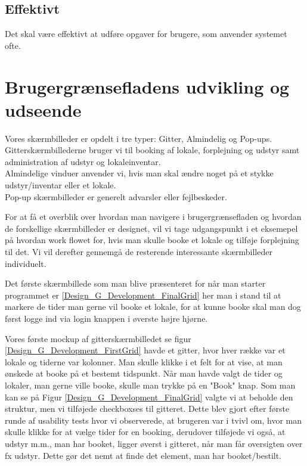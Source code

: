 \subsection{Effektivt}
Det skal være effektivt at udføre opgaver for brugere, som anvender systemet ofte.

\section{Brugergrænsefladens udvikling og udseende}
\label{Design_G_Development}
Vores skærmbilleder er opdelt i tre typer: Gitter, Almindelig og Pop-ups. 
\\Gitterskærmbillederne bruger vi til booking af lokale, forplejning og udstyr samt administration af udstyr og lokaleinventar.
\\Almindelige vinduer anvender vi, hvis man skal ændre noget på et stykke udstyr/inventar eller et lokale.
\\Pop-up skærmbilleder er generelt advarsler eller fejlbeskeder.

For at få et overblik over hvordan man navigere i brugergrænsefladen og hvordan de forskellige skærmbilleder er designet, vil vi tage udgangspunkt i et eksemepel på hvordan work flowet for, hvis man skulle booke et lokale og tilføje forplejning til det. Vi vil derefter gennemgå de resterende interessante skærmbilleder individuelt.

Det første skærmbillede som man blive præsenteret for når man starter programmet er \ref{Design_G_Development_FinalGrid} her man i stand til at markere de tider man gerne vil booke et lokale, for at kunne booke skal man dog først logge ind via login knappen i øverste højre hjørne. 

Vores første mockup af gitterskærmbilledet se figur \ref{Design_G_Development_FirstGrid} havde et gitter, hvor hver række var et lokale og tiderne var kolonner. Man skulle klikke i et felt for at vise, at man ønskede at booke på et bestemt tidspunkt. Når man havde valgt de tider og lokaler, man gerne ville booke, skulle man trykke på en "Book" knap. 
Som man kan se på Figur \ref{Design_G_Development_FinalGrid} valgte vi at beholde den struktur, men vi tilføjede checkboxses til gitteret. Dette blev gjort efter første runde af usability tests hvor vi observerede, at brugeren var i tvivl om, hvor man skulle klikke for at vælge tider for en booking, derudover tilføjede vi også, at udstyr m.m., man har booket, ligger øverst i gitteret, når man får oversigten over fx udstyr. Dette gør det nemt at finde det element, man har booket/bestilt.

